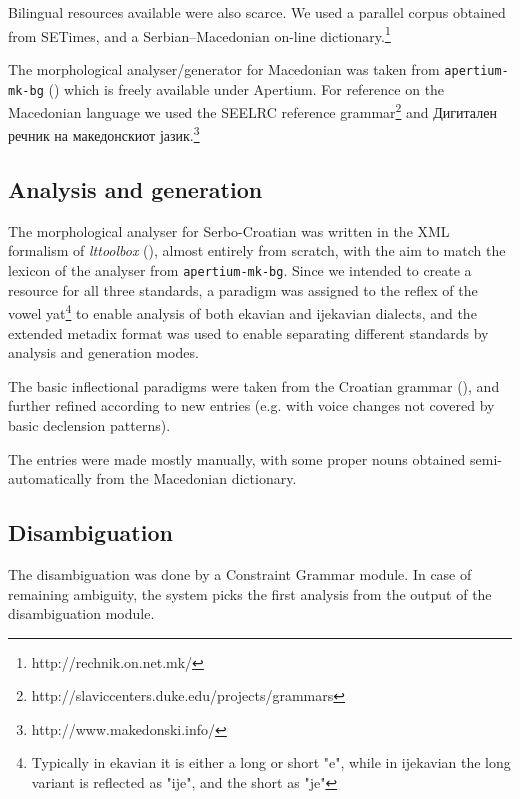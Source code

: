 \documentclass{book}
\begin{document}
Bilingual resources available were also scarce. We used a parallel corpus obtained from
SETimes, and a Serbian--Macedonian on-line dictionary.\footnote{http://rechnik.on.net.mk/}

The morphological analyser/generator for Macedonian was taken from
\texttt{apertium-mk-bg} (\citealp{rangelov2011rule}) which is freely available under Apertium.
For reference on the Macedonian language we used the SEELRC reference grammar\footnote{http://slaviccenters.duke.edu/projects/grammars} and
Дигитален речник на македонскиот јазик.\footnote{http://www.makedonski.info/}

\subsection*{Analysis and generation}
The morphological analyser for Serbo-Croatian was written in the XML formalism of
\emph{lttoolbox} (\citealp{rojas2005construccion}), almost entirely from scratch, with the
aim to match the lexicon of the analyser from \texttt{apertium-mk-bg}. Since we intended to create a resource for all three
standards, a paradigm was assigned
to the reflex of the vowel yat\footnote{Typically in ekavian it is either a long or short "e", while in ijekavian the long variant is reflected as "ije", and the short as "je"} to enable analysis of both ekavian and ijekavian dialects, 
and the extended metadix format was used to enable separating different standards by
analysis and generation modes.

The basic inflectional paradigms were taken from the Croatian grammar (\citealp{baric1997hrvatska}), 
and further refined according to new entries (e.g. with voice changes not covered by basic declension
patterns).

The entries were made mostly manually, with some proper nouns obtained semi-automatically from the Macedonian
dictionary.

\subsection*{Disambiguation}
The disambiguation was done by a Constraint Grammar module.
In case of remaining ambiguity, the system picks the first analysis from the output
of the disambiguation module.


\end{document}
